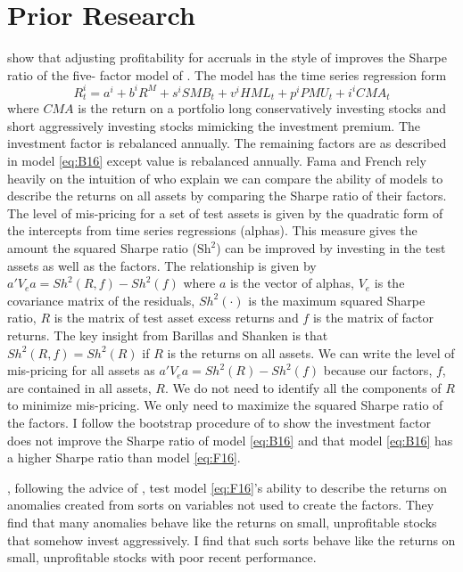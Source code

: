
\section*{Prior Research}

\textcite{fama2016choosing} show that adjusting profitability for accruals in
the style of \textcite{ball2016accruals} improves the Sharpe ratio of the five-
factor model of \textcite{fama2015five}.
The model has the time series regression form
\begin{equation} \label{eq:F16}
R_t^i = a^i+b^iR^M+s^iSMB_t+v^iHML_t+p^iPMU_t+i^iCMA_t
\end{equation}
where $CMA$ is the return on a portfolio long conservatively investing stocks
and short aggressively investing stocks mimicking the investment premium.
The investment factor is rebalanced annually.
The remaining factors are as described in model \ref{eq:B16} except value is
rebalanced annually.
Fama and French rely heavily on the intuition of \textcite{barillas2016alpha}
who explain we can compare the ability of models to describe the returns on all
assets by comparing the Sharpe ratio of their factors.
The level of mis-pricing for a set of test assets is given by the quadratic
form of the intercepts from time series regressions (alphas).
This measure gives the amount the squared Sharpe ratio ($\text{Sh}^2$) can be
improved by investing in the test assets as well as the factors.
The relationship is given by $a'V_ea=Sh^2\left(R,f\right)-Sh^2\left(f\right)$
where $a$ is the vector of alphas, $V_e$ is the covariance matrix of the
residuals, $Sh^2\left(\cdot\right)$ is the maximum squared Sharpe ratio, $R$ is
the matrix of test asset excess returns and $f$ is the matrix of factor
returns.
The key insight from Barillas and Shanken is that
$Sh^2\left(R,f\right)=Sh^2\left(R\right)$ if $R$ is the returns on all assets.
We can write the level of mis-pricing for all assets as
$a'V_ea=Sh^2\left(R\right)-Sh^2\left(f\right)$ because our factors, $f$, are
contained in all assets, $R$.
We do not need to identify all the components of $R$ to minimize mis-pricing.
We only need to maximize the squared Sharpe ratio of the factors.
I follow the bootstrap procedure of \textcite{fama2016choosing} to show the
investment factor does not improve the Sharpe ratio of model \ref{eq:B16} and
that model \ref{eq:B16} has a higher Sharpe ratio than model \ref{eq:F16}.

\textcite{fama2016dissecting}, following the advice of
\textcite{lewellen2010skeptical}, test model \ref{eq:F16}'s ability to describe
the returns on anomalies created from sorts on variables not used to create the
factors. They find that many anomalies
behave like the returns on small, unprofitable stocks that
somehow invest aggressively. I find that such sorts behave like the returns on
small, unprofitable stocks with poor recent performance.

